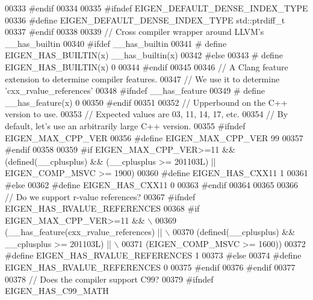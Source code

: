\begin{DoxyCode}
00333 \textcolor{preprocessor}{#endif}
00334 
00335 \textcolor{preprocessor}{#ifndef EIGEN\_DEFAULT\_DENSE\_INDEX\_TYPE}
00336 \textcolor{preprocessor}{#define EIGEN\_DEFAULT\_DENSE\_INDEX\_TYPE std::ptrdiff\_t}
00337 \textcolor{preprocessor}{#endif}
00338 
00339 \textcolor{comment}{// Cross compiler wrapper around LLVM's \_\_has\_builtin}
00340 \textcolor{preprocessor}{#ifdef \_\_has\_builtin}
00341 \textcolor{preprocessor}{#  define EIGEN\_HAS\_BUILTIN(x) \_\_has\_builtin(x)}
00342 \textcolor{preprocessor}{#else}
00343 \textcolor{preprocessor}{#  define EIGEN\_HAS\_BUILTIN(x) 0}
00344 \textcolor{preprocessor}{#endif}
00345 
00346 \textcolor{comment}{// A Clang feature extension to determine compiler features.}
00347 \textcolor{comment}{// We use it to determine 'cxx\_rvalue\_references'}
00348 \textcolor{preprocessor}{#ifndef \_\_has\_feature}
00349 \textcolor{preprocessor}{# define \_\_has\_feature(x) 0}
00350 \textcolor{preprocessor}{#endif}
00351 
00352 \textcolor{comment}{// Upperbound on the C++ version to use.}
00353 \textcolor{comment}{// Expected values are 03, 11, 14, 17, etc.}
00354 \textcolor{comment}{// By default, let's use an arbitrarily large C++ version.}
00355 \textcolor{preprocessor}{#ifndef EIGEN\_MAX\_CPP\_VER}
00356 \textcolor{preprocessor}{#define EIGEN\_MAX\_CPP\_VER 99}
00357 \textcolor{preprocessor}{#endif}
00358 
00359 \textcolor{preprocessor}{#if EIGEN\_MAX\_CPP\_VER>=11 && (defined(\_\_cplusplus) && (\_\_cplusplus >= 201103L) || EIGEN\_COMP\_MSVC >= 1900)}
00360 \textcolor{preprocessor}{#define EIGEN\_HAS\_CXX11 1}
00361 \textcolor{preprocessor}{#else}
00362 \textcolor{preprocessor}{#define EIGEN\_HAS\_CXX11 0}
00363 \textcolor{preprocessor}{#endif}
00364 
00365 
00366 \textcolor{comment}{// Do we support r-value references?}
00367 \textcolor{preprocessor}{#ifndef EIGEN\_HAS\_RVALUE\_REFERENCES}
00368 \textcolor{preprocessor}{#if EIGEN\_MAX\_CPP\_VER>=11 && \(\backslash\)}
00369 \textcolor{preprocessor}{    (\_\_has\_feature(cxx\_rvalue\_references) || \(\backslash\)}
00370 \textcolor{preprocessor}{    (defined(\_\_cplusplus) && \_\_cplusplus >= 201103L) || \(\backslash\)}
00371 \textcolor{preprocessor}{    (EIGEN\_COMP\_MSVC >= 1600))}
00372 \textcolor{preprocessor}{  #define EIGEN\_HAS\_RVALUE\_REFERENCES 1}
00373 \textcolor{preprocessor}{#else}
00374 \textcolor{preprocessor}{  #define EIGEN\_HAS\_RVALUE\_REFERENCES 0}
00375 \textcolor{preprocessor}{#endif}
00376 \textcolor{preprocessor}{#endif}
00377 
00378 \textcolor{comment}{// Does the compiler support C99?}
00379 \textcolor{preprocessor}{#ifndef EIGEN\_HAS\_C99\_MATH}

\end{DoxyCode}
